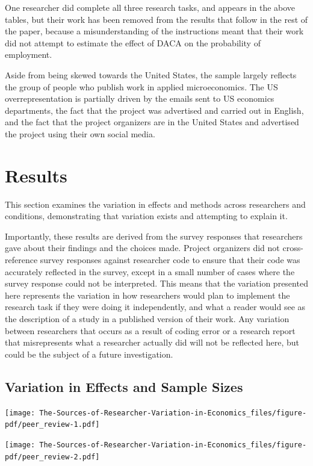 \documentclass[
  letterpaper,
  DIV=11,
  numbers=noendperiod]{scrartcl}
\begin{document}
One researcher did complete all three research tasks, and appears in the
above tables, but their work has been removed from the results that
follow in the rest of the paper, because a misunderstanding of the
instructions meant that their work did not attempt to estimate the
effect of DACA on the probability of employment.

Aside from being skewed towards the United States, the sample largely
reflects the group of people who publish work in applied microeconomics.
The US overrepresentation is partially driven by the emails sent to US
economics departments, the fact that the project was advertised and
carried out in English, and the fact that the project organizers are in
the United States and advertised the project using their own social
media.

\section{Results}\label{results}

This section examines the variation in effects and methods across
researchers and conditions, demonstrating that variation exists and
attempting to explain it.

Importantly, these results are derived from the survey responses that
researchers gave about their findings and the choices made. Project
organizers did not cross-reference survey responses against researcher
code to ensure that their code was accurately reflected in the survey,
except in a small number of cases where the survey response could not be
interpreted. This means that the variation presented here represents the
variation in how researchers would plan to implement the research task
if they were doing it independently, and what a reader would see as the
description of a study in a published version of their work. Any
variation between researchers that occurs as a result of coding error or
a research report that misrepresents what a researcher actually did will
not be reflected here, but could be the subject of a future
investigation.

\subsection{Variation in Effects and Sample Sizes}\label{sec-variation}

\texttt{[image: The-Sources-of-Researcher-Variation-in-Economics\_files/figure-pdf/peer\_review-1.pdf]}

\texttt{[image: The-Sources-of-Researcher-Variation-in-Economics\_files/figure-pdf/peer\_review-2.pdf]}
\end{document}
